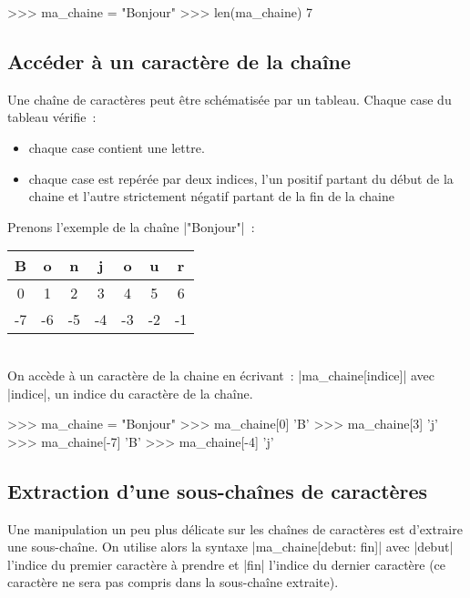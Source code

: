 		\begin{pythoncode}
			>>> ma_chaine = "Bonjour"
			>>> len(ma_chaine)
			7
		\end{pythoncode}
	
	\subsection{Accéder à un caractère de la chaîne}
	
		Une chaîne de caractères peut être schématisée par un tableau. Chaque case du tableau vérifie~:
		\begin{itemize}
			\item chaque case contient une lettre.
			\item chaque case est repérée par deux indices, l'un positif partant du début de la chaine et l'autre strictement négatif partant de la fin de la chaine
		\end{itemize}
		Prenons l'exemple de la chaîne \python|"Bonjour"|~: \\
		
		\begin{tabular}{|*{7}{c|}} \hline
			 B &  o &  n &  j &  o &  u &  r \\ \hline
			 0 &  1 &  2 &  3 &  4 &  5 &  6 \\ \hline
			-7 & -6 & -5 & -4 & -3 & -2 & -1 \\ \hline
		\end{tabular} \\
		
		On accède à un caractère de la chaine en écrivant~: \python|ma_chaine[indice]| avec \python|indice|, un indice du caractère de la chaîne.
		\begin{pythoncode}
			>>> ma_chaine = "Bonjour"
			>>> ma_chaine[0]
			'B'
			>>> ma_chaine[3]
			'j'
			>>> ma_chaine[-7]
			'B'
			>>> ma_chaine[-4]
			'j'
		\end{pythoncode}

	\subsection{Extraction d'une sous-chaînes de caractères}
		
		Une manipulation un peu plus délicate sur les chaînes de caractères est d'extraire une sous-chaîne.
		On utilise alors la syntaxe \python|ma_chaine[debut: fin]| avec \python|debut| l'indice du premier caractère à prendre et \python|fin| l'indice du dernier caractère (ce caractère ne sera pas compris dans la sous-chaîne extraite).
		
